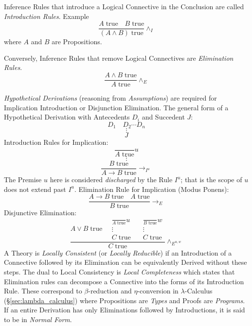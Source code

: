 Inference Rules that introduce a Logical Connective in the Conclusion
are called \emph{Introduction Rules}. Example
\[
    {
        \frac{A\;\mathrm{true} \quad B\;\mathrm{true}}
        {(A \wedge B)\;\mathrm{true}}
    } \wedge_I
\]
where $A$ and $B$ are Propositions.

Conversely, Inference Rules that remove Logical Connectives are
\emph{Elimination Rules}.
\[
    {
        \frac{A \wedge B\;\mathrm{true}}
        {A\;\mathrm{true}}
    } \wedge_E
\]

\emph{Hypothetical Derivations} (reasoning from \emph{Assumptions})
are required for Implication Introduction or Disjunction
Elimination. The general form of a Hypothetical Derivation with
Antecedents $D_i$ and Succedent $J$:
\[
    D_1 \quad D_2 \cdots D_n
\]\[
    \vdots
\]\[
    J
\]
Introduction Rules for Implication:
\[
    {
        \frac{}
        {A\;\mathrm{true}}
    } u
\]\[
    \vdots
\]\[
    {
        \frac{B\;\mathrm{true}}
        {A \rightarrow B\;\mathrm{true}}
    } \rightarrow_{I^u}
\]
The Premise $u$ here is considered \emph{discharged} by the Rule
$I^u$; that is the scope of $u$ does not extend past $I^u$.
Elimination Rule for Implication (Modus Ponens):
\[
    {
        \frac{A \rightarrow B\;\mathrm{true} \quad A\;\mathrm{true}}
        {B\;\mathrm{true}}
    } \rightarrow_{E}
\]
Disjunctive Elimination:
\[
    \frac{
    A \vee B\;\mathrm{true} \quad
    \begin{matrix}
        {
            \frac{}
            {A\;\mathrm{true}}
        }u \\
        \vdots \\
        C\;\mathrm{true}
    \end{matrix}
    \quad
    \begin{matrix}
        {
            \frac{}
            {B\;\mathrm{true}}
        }w \\
        \vdots \\
        C\;\mathrm{true}
    \end{matrix}
    }{ C\;\mathrm{true}}\wedge_{E^{u,w}}
\]
A Theory is \emph{Locally Consistent} (or \emph{Locally Reducible}) if
an Introduction of a Connective followed by its Elimination can be
equivalently Derived without these steps.  The dual to Local
Consistency is \emph{Local Completeness} which states that Elimination
rules can decompose a Connective into the forms of its Introduction
Rule. These correspond to $\beta$-reduction and $\eta$-conversion in
$\lambda$-Calculus (\S\ref{sec:lambda_calculus}) where Propositions
are \emph{Types} and Proofs are \emph{Programs}. If an entire
Derivation has only Eliminations followed by Introductions, it is said
to be in \emph{Normal Form}.

